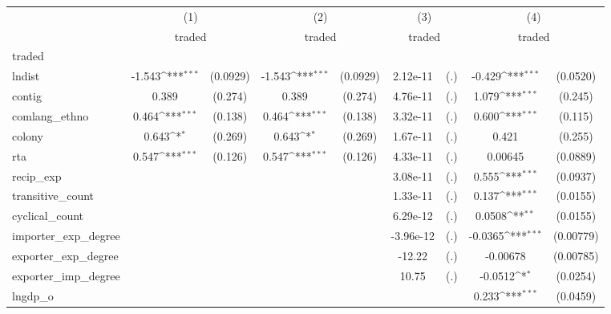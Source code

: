 {
\def\sym#1{\ifmmode^{#1}\else\(^{#1}\)\fi}
\begin{tabular}{l*{4}{cc}}
\hline\hline
          &\multicolumn{2}{c}{(1)}     &\multicolumn{2}{c}{(2)}     &\multicolumn{2}{c}{(3)}     &\multicolumn{2}{c}{(4)}     \\
          &\multicolumn{2}{c}{traded}  &\multicolumn{2}{c}{traded}  &\multicolumn{2}{c}{traded}  &\multicolumn{2}{c}{traded}  \\
\hline
traded    &                  &         &                  &         &                  &         &                  &         \\
lndist    &   -1.543\sym{***}& (0.0929)&   -1.543\sym{***}& (0.0929)& 2.12e-11         &      (.)&   -0.429\sym{***}& (0.0520)\\
contig    &    0.389         &  (0.274)&    0.389         &  (0.274)& 4.76e-11         &      (.)&    1.079\sym{***}&  (0.245)\\
comlang\_ethno&    0.464\sym{***}&  (0.138)&    0.464\sym{***}&  (0.138)& 3.32e-11         &      (.)&    0.600\sym{***}&  (0.115)\\
colony    &    0.643\sym{*}  &  (0.269)&    0.643\sym{*}  &  (0.269)& 1.67e-11         &      (.)&    0.421         &  (0.255)\\
rta       &    0.547\sym{***}&  (0.126)&    0.547\sym{***}&  (0.126)& 4.33e-11         &      (.)&  0.00645         & (0.0889)\\
recip\_exp &                  &         &                  &         & 3.08e-11         &      (.)&    0.555\sym{***}& (0.0937)\\
transitive\_count&                  &         &                  &         & 1.33e-11         &      (.)&    0.137\sym{***}& (0.0155)\\
cyclical\_count&                  &         &                  &         & 6.29e-12         &      (.)&   0.0508\sym{**} & (0.0155)\\
importer\_exp\_degree&                  &         &                  &         &-3.96e-12         &      (.)&  -0.0365\sym{***}&(0.00779)\\
exporter\_exp\_degree&                  &         &                  &         &   -12.22         &      (.)& -0.00678         &(0.00785)\\
exporter\_imp\_degree&                  &         &                  &         &    10.75         &      (.)&  -0.0512\sym{*}  & (0.0254)\\
lngdp\_o   &                  &         &                  &         &                  &         &    0.233\sym{***}& (0.0459)\\

\end{tabular}}
